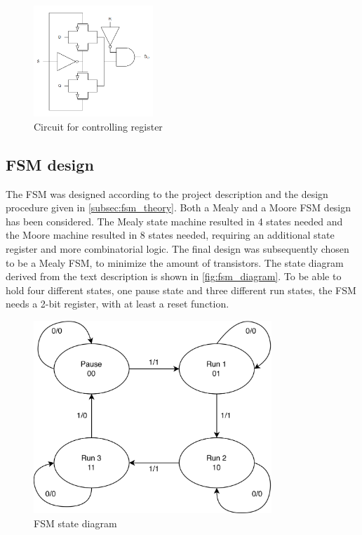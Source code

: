 \begin{figure}[H]
    \centering
    \includegraphics[width=0.4\textwidth]{Figures/setReset.png}
    \caption{Circuit for controlling register}
    \label{fig:setreset}
\end{figure}

\subsection{FSM design}

The FSM was designed according to the project description and the design procedure given in \autoref{subsec:fsm_theory}. Both a Mealy and a Moore FSM design has been considered. The Mealy state machine resulted in 4 states needed and the Moore machine resulted in 8 states needed, requiring an additional state register and more combinatorial logic. The final design was subsequently chosen to be a Mealy FSM, to minimize the amount of transistors. The state diagram derived from the text description is shown in \autoref{fig:fsm_diagram}. To be able to hold four different states, one pause state and three different run states, the FSM needs a 2-bit register, with at least a reset function. 

\begin{figure}[H]
    \centering
    \includegraphics[width=0.8\textwidth]{Figures/FSM-diagram.png}
    \caption{FSM state diagram}
    \label{fig:fsm_diagram}
\end{figure}

